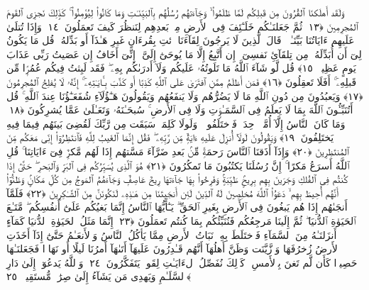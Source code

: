  وَلَقَد أَهلَكنَا ٱلقُرُونَ مِن قَبلِكُم لَمَّا ظَلَمُوا۟ ۙ وَجَآءَتهُم رُسُلُهُم بِٱلبَيِّنَـٰتِ وَمَا كَانُوا۟ لِيُؤمِنُوا۟ ۚ كَذَٟلِكَ نَجزِى ٱلقَومَ ٱلمُجرِمِينَ ﴿١٣﴾
 ثُمَّ جَعَلنَـٰكُم خَلَـٰٓئِفَ فِى ٱلأَرضِ مِنۢ بَعدِهِم لِنَنظُرَ كَيفَ تَعمَلُونَ ﴿١٤﴾
 وَإِذَا تُتلَىٰ عَلَيهِم ءَايَاتُنَا بَيِّنَـٰتٍۢ ۙ قَالَ ٱلَّذِينَ لَا يَرجُونَ لِقَآءَنَا ٱئتِ بِقُرءَانٍ غَيرِ هَـٰذَآ أَو بَدِّلهُ ۚ قُل مَا يَكُونُ لِىٓ أَن أُبَدِّلَهُۥ مِن تِلقَآئِ نَفسِىٓ ۖ إِن أَتَّبِعُ إِلَّا مَا يُوحَىٰٓ إِلَىَّ ۖ إِنِّىٓ أَخَافُ إِن عَصَيتُ رَبِّى عَذَابَ يَومٍ عَظِيمٍۢ ﴿١٥﴾
 قُل لَّو شَآءَ ٱللَّهُ مَا تَلَوتُهُۥ عَلَيكُم وَلَآ أَدرَىٰكُم بِهِۦ ۖ فَقَد لَبِثتُ فِيكُم عُمُرًۭا مِّن قَبلِهِۦٓ ۚ أَفَلَا تَعقِلُونَ ﴿١٦﴾
 فَمَن أَظلَمُ مِمَّنِ ٱفتَرَىٰ عَلَى ٱللَّهِ كَذِبًا أَو كَذَّبَ بِـَٔايَـٰتِهِۦٓ ۚ إِنَّهُۥ لَا يُفلِحُ ٱلمُجرِمُونَ ﴿١٧﴾
 وَيَعبُدُونَ مِن دُونِ ٱللَّهِ مَا لَا يَضُرُّهُم وَلَا يَنفَعُهُم وَيَقُولُونَ هَـٰٓؤُلَآءِ شُفَعَـٰٓؤُنَا عِندَ ٱللَّهِ ۚ قُل أَتُنَبِّـُٔونَ ٱللَّهَ بِمَا لَا يَعلَمُ فِى ٱلسَّمَـٰوَٟتِ وَلَا فِى ٱلأَرضِ ۚ سُبحَـٰنَهُۥ وَتَعَـٰلَىٰ عَمَّا يُشرِكُونَ ﴿١٨﴾
 وَمَا كَانَ ٱلنَّاسُ إِلَّآ أُمَّةًۭ وَٟحِدَةًۭ فَٱختَلَفُوا۟ ۚ وَلَولَا كَلِمَةٌۭ سَبَقَت مِن رَّبِّكَ لَقُضِىَ بَينَهُم فِيمَا فِيهِ يَختَلِفُونَ ﴿١٩﴾
 وَيَقُولُونَ لَولَآ أُنزِلَ عَلَيهِ ءَايَةٌۭ مِّن رَّبِّهِۦ ۖ فَقُل إِنَّمَا ٱلغَيبُ لِلَّهِ فَٱنتَظِرُوٓا۟ إِنِّى مَعَكُم مِّنَ ٱلمُنتَظِرِينَ ﴿٢٠﴾
 وَإِذَآ أَذَقنَا ٱلنَّاسَ رَحمَةًۭ مِّنۢ بَعدِ ضَرَّآءَ مَسَّتهُم إِذَا لَهُم مَّكرٌۭ فِىٓ ءَايَاتِنَا ۚ قُلِ ٱللَّهُ أَسرَعُ مَكرًا ۚ إِنَّ رُسُلَنَا يَكتُبُونَ مَا تَمكُرُونَ ﴿٢١﴾
 هُوَ ٱلَّذِى يُسَيِّرُكُم فِى ٱلبَرِّ وَٱلبَحرِ ۖ حَتَّىٰٓ إِذَا كُنتُم فِى ٱلفُلكِ وَجَرَينَ بِهِم بِرِيحٍۢ طَيِّبَةٍۢ وَفَرِحُوا۟ بِهَا جَآءَتهَا رِيحٌ عَاصِفٌۭ وَجَآءَهُمُ ٱلمَوجُ مِن كُلِّ مَكَانٍۢ وَظَنُّوٓا۟ أَنَّهُم أُحِيطَ بِهِم ۙ دَعَوُا۟ ٱللَّهَ مُخلِصِينَ لَهُ ٱلدِّينَ لَئِن أَنجَيتَنَا مِن هَـٰذِهِۦ لَنَكُونَنَّ مِنَ ٱلشَّـٰكِرِينَ ﴿٢٢﴾
 فَلَمَّآ أَنجَىٰهُم إِذَا هُم يَبغُونَ فِى ٱلأَرضِ بِغَيرِ ٱلحَقِّ ۗ يَـٰٓأَيُّهَا ٱلنَّاسُ إِنَّمَا بَغيُكُم عَلَىٰٓ أَنفُسِكُم ۖ مَّتَـٰعَ ٱلحَيَوٰةِ ٱلدُّنيَا ۖ ثُمَّ إِلَينَا مَرجِعُكُم فَنُنَبِّئُكُم بِمَا كُنتُم تَعمَلُونَ ﴿٢٣﴾
 إِنَّمَا مَثَلُ ٱلحَيَوٰةِ ٱلدُّنيَا كَمَآءٍ أَنزَلنَـٰهُ مِنَ ٱلسَّمَآءِ فَٱختَلَطَ بِهِۦ نَبَاتُ ٱلأَرضِ مِمَّا يَأكُلُ ٱلنَّاسُ وَٱلأَنعَـٰمُ حَتَّىٰٓ إِذَآ أَخَذَتِ ٱلأَرضُ زُخرُفَهَا وَٱزَّيَّنَت وَظَنَّ أَهلُهَآ أَنَّهُم قَـٰدِرُونَ عَلَيهَآ أَتَىٰهَآ أَمرُنَا لَيلًا أَو نَهَارًۭا فَجَعَلنَـٰهَا حَصِيدًۭا كَأَن لَّم تَغنَ بِٱلأَمسِ ۚ كَذَٟلِكَ نُفَصِّلُ ٱلءَايَـٰتِ لِقَومٍۢ يَتَفَكَّرُونَ ﴿٢٤﴾
 وَٱللَّهُ يَدعُوٓا۟ إِلَىٰ دَارِ ٱلسَّلَـٰمِ وَيَهدِى مَن يَشَآءُ إِلَىٰ صِرَٰطٍۢ مُّستَقِيمٍۢ ﴿٢٥﴾
